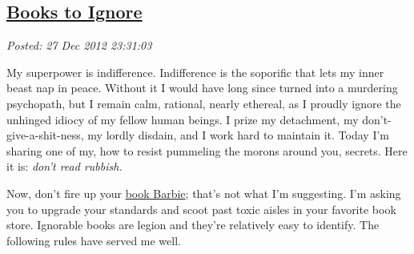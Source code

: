 %

\subsection*{\href{https://bakerjd99.wordpress.com/2012/12/27/books-to-ignore/}{Books to Ignore}}


\noindent\emph{Posted: 27 Dec 2012 23:31:03}
\vspace{6pt}

My superpower is indifference. Indifference is the soporific that lets
my inner beast nap in peace. Without it I would have long since turned
into a murdering psychopath, but I remain calm, rational, nearly
ethereal, as I proudly ignore the unhinged idiocy of my fellow human
beings. I prize my detachment, my don't-give-a-shit-ness, my lordly
disdain, and I work hard to maintain it. Today I'm sharing one of my,
how to resist pummeling the morons around you, secrets. Here it is:
\emph{don't read rubbish.}

Now, don't fire up your
\href{https://www.youtube.com/watch?v=ETJP1ElHTps}{book Barbie}; that's
not what I'm suggesting. I'm asking you to upgrade your standards and
scoot past toxic aisles in your favorite book store. Ignorable books are
legion and they're relatively easy to identify. The following rules have
served me well.

